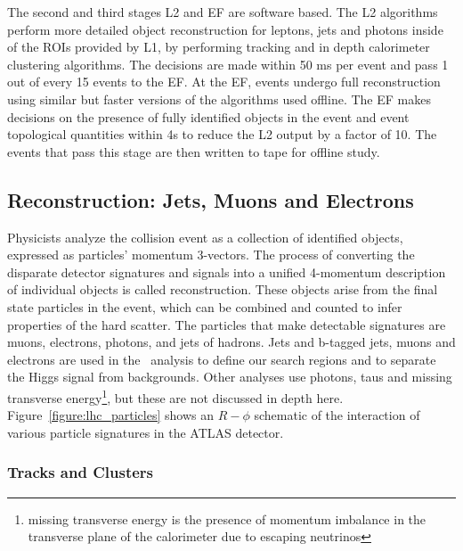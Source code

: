 The second and third stages L2 and EF are software based. The L2 algorithms perform more detailed object reconstruction for leptons, jets and photons inside of the ROIs provided by L1, by performing tracking and in depth calorimeter clustering algorithms. The decisions are made within 50 ms per event and pass 1 out of every 15 events to the EF. At the EF, events undergo full reconstruction using similar but faster versions of the algorithms used offline. The EF makes decisions on the presence of fully identified objects in the event and event topological quantities within 4s to reduce the L2 output by a factor of 10. The events that pass this stage are then written to tape for offline study.



\subsection{Reconstruction: Jets, Muons and Electrons}

Physicists analyze the collision event as a collection of identified objects, expressed as particles' momentum 3-vectors. The process of converting the disparate detector signatures and signals into a unified 4-momentum description of individual objects is called reconstruction. These objects arise from the final state particles in the event, which can be combined and counted to infer properties of the hard scatter. The particles that make detectable signatures are muons, electrons, photons, and jets of hadrons. Jets and b-tagged jets, muons and electrons are used in the \tth\ analysis to define our search regions and to separate the Higgs signal from backgrounds. Other analyses use photons, taus and missing transverse energy\footnote{missing transverse energy is the presence of momentum imbalance in the transverse plane of the calorimeter due to escaping neutrinos}, but these are not discussed in depth here. Figure~\ref{figure:lhc_particles} shows an $R-\phi$ schematic of the interaction of various particle signatures in the ATLAS detector.  

 

\subsubsection{Tracks and Clusters}

